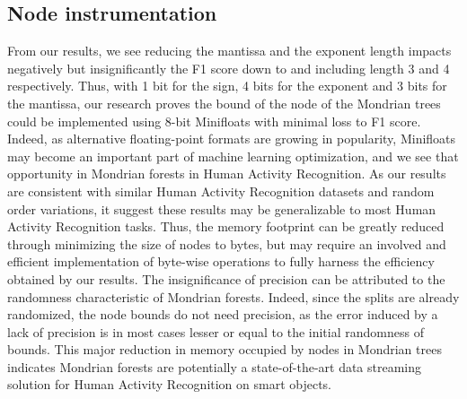 \documentclass[conference]{IEEEtran}
\begin{document}
\subsection{Node instrumentation}
From our results, we see reducing the mantissa and the exponent length impacts negatively but insignificantly the F1 score down to and including length 3 and 4 respectively. Thus, with 1 bit for the sign, 4 bits for the exponent and 3 bits for the mantissa, our research proves the bound of the node of the Mondrian trees could be implemented using 8-bit Minifloats with minimal loss to F1 score.  Indeed, as alternative floating-point formats are growing in popularity, Minifloats may become an important part of machine learning optimization, and we see that opportunity in Mondrian forests in Human Activity Recognition. As our results are consistent with similar Human Activity Recognition datasets and random order variations, it suggest these results may be generalizable to most Human Activity Recognition tasks. Thus, the memory footprint can be greatly reduced through minimizing the size of nodes to bytes, but may require an involved and efficient implementation of byte-wise operations to fully harness the efficiency obtained by our results.
The insignificance of precision can be attributed to the randomness characteristic of Mondrian forests. Indeed, since the splits are already randomized, the node bounds do not need precision, as the error induced by a lack of precision is in most cases lesser or equal to the initial randomness of bounds.
This major reduction in memory occupied by nodes in Mondrian trees indicates Mondrian forests are potentially a state-of-the-art data streaming solution for Human Activity Recognition on smart objects.
\end{document}
